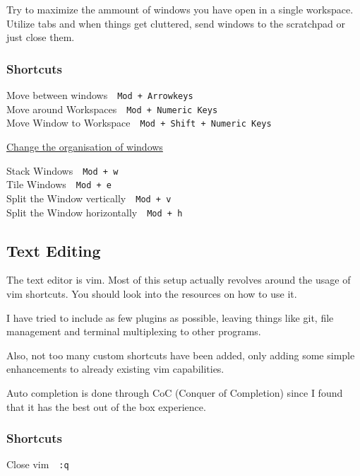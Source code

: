 \documentclass{article}
\newcommand{\ttt}[1]{\texttt{#1}}
\newcommand{\shortcut}[2]{#1~\dotfill{}~\ttt{#2}\\} %
\newcommand{\editor}{vim}
\newcommand{\shortcuttitle}[1]{\underline{#1}}
\begin{document}
Try to maximize the ammount of windows you have open in a single 
workspace. Utilize tabs and when things get cluttered, send 
windows to the scratchpad or just close them.

\subsubsection{Shortcuts}

\begin{minipage}{\textwidth}

\shortcut{Move between windows}{Mod + Arrowkeys}
\shortcut{Move around Workspaces}{Mod + Numeric Keys}
\shortcut{Move Window to Workspace}{Mod + Shift + Numeric Keys}

\end{minipage}

\begin{minipage}{\textwidth}
    \shortcuttitle{Change the organisation of windows}
    \newline

    \shortcut{Stack Windows}{Mod + w}
    \shortcut{Tile Windows}{Mod + e}

    \shortcut{Split the Window vertically}{Mod + v}
    \shortcut{Split the Window horizontally}{Mod + h}
\end{minipage}

\subsection{Text Editing}

The text editor is \editor. Most of this setup actually 
revolves around the usage of \editor{} shortcuts. You should 
look into the resources on how to use it. 

I have tried to include as few plugins as possible, leaving
things like git, file management and terminal multiplexing to other programs. 

Also, not too many custom shortcuts have been added, only adding 
some simple enhancements to already existing vim capabilities.

Auto completion is done through CoC (Conquer of Completion) since I found that it has 
the best out of the box experience.

\subsubsection{Shortcuts}

\shortcut{Close \editor}{:q}
\end{document}
